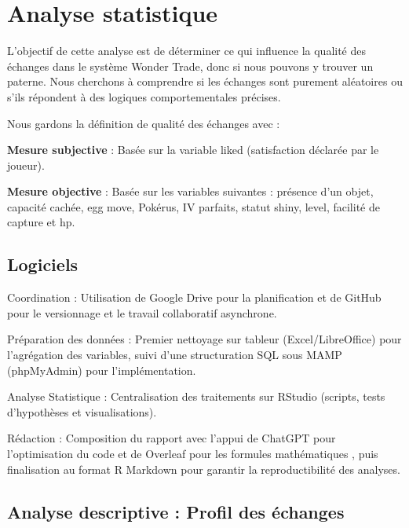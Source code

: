 \documentclass[mstat,12pt]{unswthesis}
\begin{document}
\bigskip

\chapter{Analyse statistique}\label{analyse-statistique}

L'objectif de cette analyse est de déterminer ce qui influence la
qualité des échanges dans le système Wonder Trade, donc si nous pouvons
y trouver un paterne. Nous cherchons à comprendre si les échanges sont
purement aléatoires ou s'ils répondent à des logiques comportementales
précises.

\medskip

Nous gardons la définition de qualité des échanges avec :

\textbf{Mesure subjective} : Basée sur la variable liked (satisfaction
déclarée par le joueur).

\medskip

\textbf{Mesure objective} : Basée sur les variables suivantes : présence
d'un objet, capacité cachée, egg move, Pokérus, IV parfaits, statut
shiny, level, facilité de capture et hp.

\section{Logiciels}\label{logiciels}

Coordination : Utilisation de Google Drive pour la planification et de
GitHub pour le versionnage et le travail collaboratif asynchrone.

Préparation des données : Premier nettoyage sur tableur
(Excel/LibreOffice) pour l'agrégation des variables, suivi d'une
structuration SQL sous MAMP (phpMyAdmin) pour l'implémentation.

Analyse Statistique : Centralisation des traitements sur RStudio
(scripts, tests d'hypothèses et visualisations).

Rédaction : Composition du rapport avec l'appui de ChatGPT pour
l'optimisation du code et de Overleaf pour les formules mathématiques ,
puis finalisation au format R Markdown pour garantir la reproductibilité
des analyses.

\bigskip

\section{Analyse descriptive : Profil des
échanges}\label{analyse-descriptive-profil-des-uxe9changes}
\end{document}

